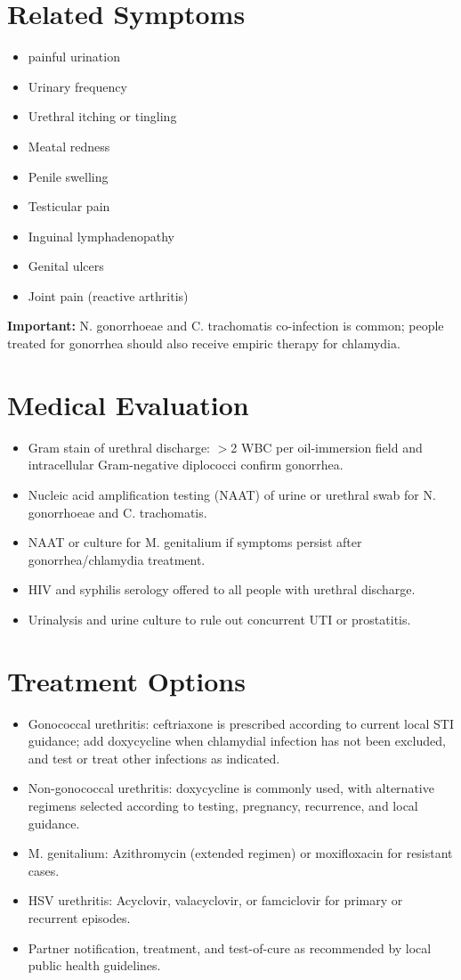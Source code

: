 \section*{Related Symptoms}
\begin{itemize}
  \item painful urination
  \item Urinary frequency
  \item Urethral itching or tingling
  \item Meatal redness
  \item Penile swelling
  \item Testicular pain
  \item Inguinal lymphadenopathy
  \item Genital ulcers
  \item Joint pain (reactive arthritis)
\end{itemize}
\textbf{Important:} N. gonorrhoeae and C. trachomatis co-infection is common; people treated for gonorrhea should also receive empiric therapy for chlamydia.

\section*{Medical Evaluation}
\begin{itemize}
  \item Gram stain of urethral discharge: $>$2 WBC per oil-immersion field and intracellular Gram-negative diplococci confirm gonorrhea.
  \item Nucleic acid amplification testing (NAAT) of urine or urethral swab for N. gonorrhoeae and C. trachomatis.
  \item NAAT or culture for M. genitalium if symptoms persist after gonorrhea/chlamydia treatment.
  \item HIV and syphilis serology offered to all people with urethral discharge.
  \item Urinalysis and urine culture to rule out concurrent UTI or prostatitis.
\end{itemize}

\section*{Treatment Options}
\begin{itemize}
  \item Gonococcal urethritis: ceftriaxone is prescribed according to current local STI guidance; add doxycycline when chlamydial infection has not been excluded, and test or treat other infections as indicated.
  \item Non-gonococcal urethritis: doxycycline is commonly used, with alternative regimens selected according to testing, pregnancy, recurrence, and local guidance.
  \item M. genitalium: Azithromycin (extended regimen) or moxifloxacin for resistant cases.
  \item HSV urethritis: Acyclovir, valacyclovir, or famciclovir for primary or recurrent episodes.
  \item Partner notification, treatment, and test-of-cure as recommended by local public health guidelines.
\end{itemize}

